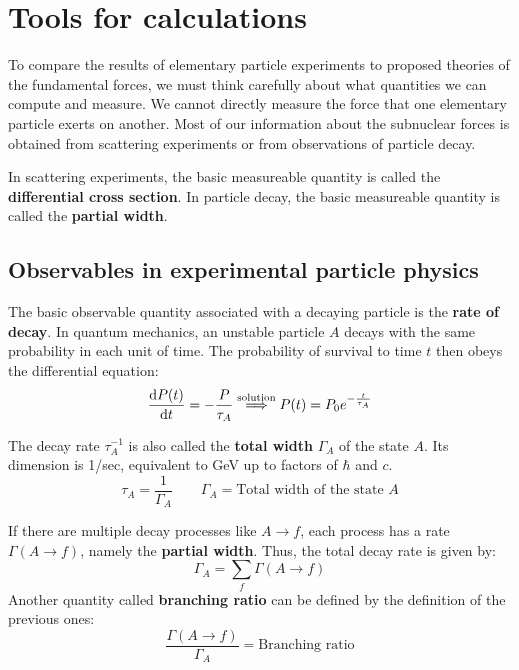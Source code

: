 \documentclass[../../main/main.tex]{subfiles}
\begin{document}
\chapter{Tools for calculations}
To compare the results of elementary particle experiments to proposed theories of the fundamental forces, we must think carefully about what quantities we can compute and measure. We cannot directly measure the force that one elementary particle exerts on another. Most of our information about the subnuclear forces is obtained from scattering experiments or from observations of particle decay.

In scattering experiments, the basic measureable quantity is called the \textbf{differential cross section}. In particle decay, the basic measureable quantity is called the \textbf{partial width}.





\section{Observables in experimental particle physics}
The basic observable quantity associated with a decaying particle is the \textbf{rate of decay}. In quantum mechanics, an unstable particle \( A \) decays with the same probability in each unit of time. The probability of survival to time \( t \) then obeys the differential equation:
\begin{equation}
    \dv{P(t)}{t} = - \frac{P}{\tau_A}
    \overset{\text{solution}}{\Longrightarrow}
    P(t) = P_0 e^{-\frac{t}{\tau_A}}
    \label{eq:L03_PST}
\end{equation}

The decay rate \( \tau_{A}^{-1} \) is also called the \textbf{total width} \( \Gamma_{A} \) of the state \( A \). Its dimension is 1/sec, equivalent to GeV up to factors of \( \hbar \) and \( c \).
\begin{equation}
    \tau_A = \frac{1}{\Gamma_A}
    \qquad
    \Gamma_A = \text{Total width of the state } A
    \label{eq:L03_TW}
\end{equation}

If there are multiple decay processes like \( A \longrightarrow f \), each process has a rate \( \Gamma(A\longrightarrow f) \), namely the \textbf{partial width}. Thus, the total decay rate is given by:
\begin{equation}
    \Gamma_A = \sum_{f} \Gamma(A \longrightarrow f)
    \label{eq:L03_TDR}
\end{equation}
Another quantity called \textbf{branching ratio} can be defined by the definition of the previous ones:
\begin{equation}
    \frac{\Gamma(A \longrightarrow f)}{\Gamma_A}
    =
    \text{Branching ratio}
    \label{eq:L03_BR}
\end{equation}
\end{document}
